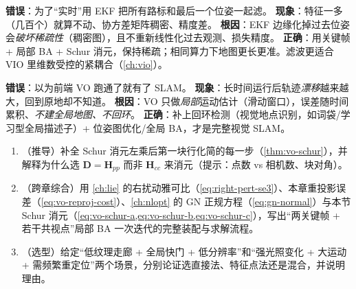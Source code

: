 \begin{pitfall}
\textbf{错误}：为了“实时”用 EKF 把所有路标和最后一个位姿一起滤。
\textbf{现象}：特征一多（几百个）就算不动、协方差矩阵稠密、精度差。
\textbf{根因}：EKF 边缘化掉过去位姿会\emph{破坏稀疏性}（稠密图），且不重新线性化过去观测、损失精度\cite{carlone2026handbook}。
\textbf{正确}：用关键帧 + 局部 BA + Schur 消元，保持稀疏；相同算力下地图更长更准。滤波更适合 VIO 里维数受控的紧耦合（\cref{ch:vio}）。
\end{pitfall}

\begin{pitfall}
\textbf{错误}：以为前端 VO 跑通了就有了 SLAM。
\textbf{现象}：长时间运行后轨迹\emph{漂移}越来越大，回到原地却不知道。
\textbf{根因}：VO 只做\emph{局部}运动估计（滑动窗口），误差随时间累积、\emph{不建全局地图、不回环}\cite{carlone2026handbook}。
\textbf{正确}：补上回环检测（视觉地点识别，如词袋/学习型全局描述子）+ 位姿图优化/全局 BA，才是完整视觉 SLAM。
\end{pitfall}

\begin{practice}
\begin{enumerate}
  \item （推导）补全 Schur 消元左乘后第一块行化简的每一步（\cref{thm:vo-schur}），并解释为什么选 $\mathbf{D}=\mathbf{H}_{pp}$ 而非 $\mathbf{H}_{cc}$ 来消元（提示：点数 vs 相机数、块对角）。
  \item （跨章综合）用 \cref{ch:lie} 的右扰动雅可比（\cref{eq:right-pert-se3}）、本章重投影误差（\cref{eq:vo-reproj-cost}）、\cref{ch:nlopt} 的 GN 正规方程（\cref{eq:gn-normal}）与本节 Schur 消元（\cref{eq:vo-schur-a,eq:vo-schur-b,eq:vo-schur-c}），写出“两关键帧 + 若干共视点”局部 BA 一次迭代的完整装配与求解流程。
  \item （选型）给定“低纹理走廊 + 全局快门 + 低分辨率”和“强光照变化 + 大运动 + 需频繁重定位”两个场景，分别论证选直接法、特征点法还是混合，并说明理由。
\end{enumerate}
\end{practice}

